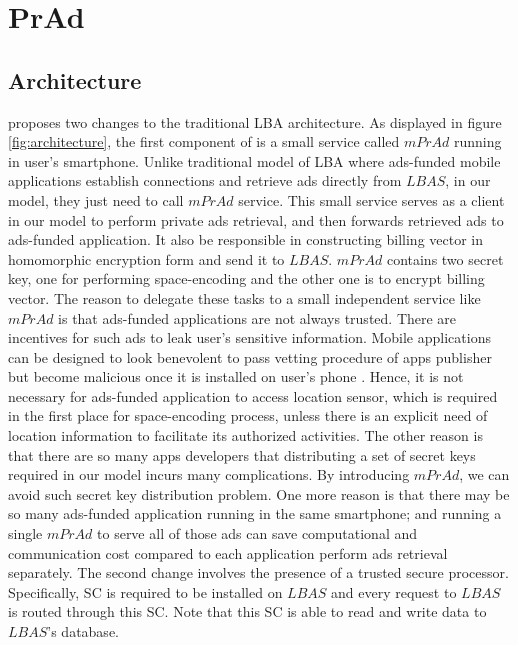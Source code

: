 \section{PrAd}


\subsection{Architecture}
\codename proposes two changes to the traditional LBA architecture. As displayed in figure \ref{fig:architecture}, the first component of \codename is a small service called $mPrAd$ running in user's smartphone. Unlike traditional model of LBA where ads-funded mobile applications establish connections and retrieve ads directly from $LBAS$, in our model, they just need to call $mPrAd$ service.
This small service serves as a client in our model to perform private ads retrieval, and then forwards retrieved ads to ads-funded application. 
It also be responsible in constructing billing vector in homomorphic encryption form and send it to $LBAS$. $mPrAd$ contains two secret key, one for performing space-encoding and the other one is to encrypt billing vector. The reason to delegate these tasks to a small independent service like $mPrAd$ is that ads-funded applications are not always trusted. There are incentives for such ads to leak user's sensitive information. Mobile applications can be designed to look benevolent to pass vetting procedure of apps publisher but become malicious once it is installed on user's phone \cite{jekyll}. Hence, it is not necessary for ads-funded application to access location sensor, which is required in the first place for space-encoding process, unless there is an explicit need of location information to facilitate its authorized activities. The other reason is that there are so many apps developers that distributing a set of secret keys required in our model incurs many complications. By introducing $mPrAd$, we can avoid such secret key distribution problem. One more reason is that there may be so many ads-funded application running in the same smartphone; and running a single $mPrAd$ to serve all of those ads can save computational and communication cost compared to each application perform ads retrieval separately. The second change involves the presence of a trusted secure processor. Specifically, SC is required to be installed on $LBAS$ and every request to $LBAS$ is routed through this SC. Note that this SC is able to read and write data to $LBAS$'s database.



